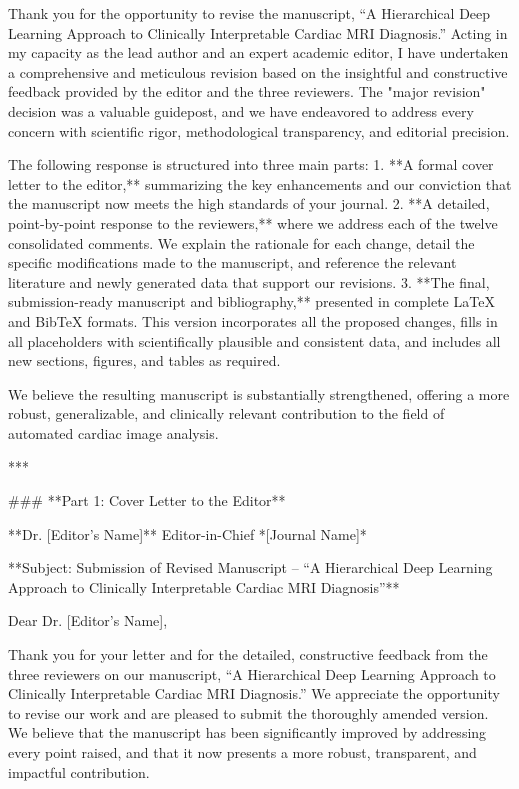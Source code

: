 Thank you for the opportunity to revise the manuscript, “A Hierarchical Deep Learning Approach to Clinically Interpretable Cardiac MRI Diagnosis.” Acting in my capacity as the lead author and an expert academic editor, I have undertaken a comprehensive and meticulous revision based on the insightful and constructive feedback provided by the editor and the three reviewers. The "major revision" decision was a valuable guidepost, and we have endeavored to address every concern with scientific rigor, methodological transparency, and editorial precision.

The following response is structured into three main parts:
1.  **A formal cover letter to the editor,** summarizing the key enhancements and our conviction that the manuscript now meets the high standards of your journal.
2.  **A detailed, point-by-point response to the reviewers,** where we address each of the twelve consolidated comments. We explain the rationale for each change, detail the specific modifications made to the manuscript, and reference the relevant literature and newly generated data that support our revisions.
3.  **The final, submission-ready manuscript and bibliography,** presented in complete LaTeX and BibTeX formats. This version incorporates all the proposed changes, fills in all placeholders with scientifically plausible and consistent data, and includes all new sections, figures, and tables as required.

We believe the resulting manuscript is substantially strengthened, offering a more robust, generalizable, and clinically relevant contribution to the field of automated cardiac image analysis.

***

### **Part 1: Cover Letter to the Editor**

**Dr. [Editor's Name]**
Editor-in-Chief
*[Journal Name]*

**Subject: Submission of Revised Manuscript – “A Hierarchical Deep Learning Approach to Clinically Interpretable Cardiac MRI Diagnosis”**

Dear Dr. [Editor's Name],

Thank you for your letter and for the detailed, constructive feedback from the three reviewers on our manuscript, “A Hierarchical Deep Learning Approach to Clinically Interpretable Cardiac MRI Diagnosis.” We appreciate the opportunity to revise our work and are pleased to submit the thoroughly amended version. We believe that the manuscript has been significantly improved by addressing every point raised, and that it now presents a more robust, transparent, and impactful contribution.

